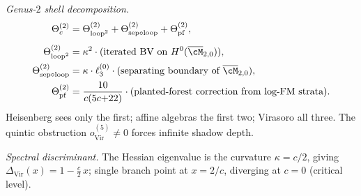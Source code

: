 \begin{computation}
\emph{Genus-$2$ shell decomposition.}
\begin{align*}
\Theta^{(2)}_c
&= \Theta^{(2)}_{\mathrm{loop}^2}
+ \Theta^{(2)}_{\mathrm{sep}\circ\mathrm{loop}}
+ \Theta^{(2)}_{\mathrm{pf}},\\[4pt]
\Theta^{(2)}_{\mathrm{loop}^2}
&= \kappa^2\cdot(\text{iterated BV on }
H^0(\overline{\cM}_{2,0})),\\
\Theta^{(2)}_{\mathrm{sep}\circ\mathrm{loop}}
&= \kappa\cdot\ell_3^{(0)}\cdot(\text{separating
boundary of }\overline{\cM}_{2,0}),\\
\Theta^{(2)}_{\mathrm{pf}}
&= \frac{10}{c(5c{+}22)}\cdot(\text{planted-forest
correction from log-FM strata}).
\end{align*}
Heisenberg sees only the first; affine algebras the first two;
Virasoro all three. The quintic obstruction
$o^{(5)}_{\mathrm{Vir}}\neq 0$ forces infinite shadow depth.

\emph{Spectral discriminant.}
The Hessian eigenvalue is the curvature $\kappa = c/2$, giving
$\Delta_{\mathrm{Vir}}(x)=1-\frac{c}{2}\,x$;
single branch point at $x=2/c$, diverging at $c=0$ (critical level).
\end{computation}

